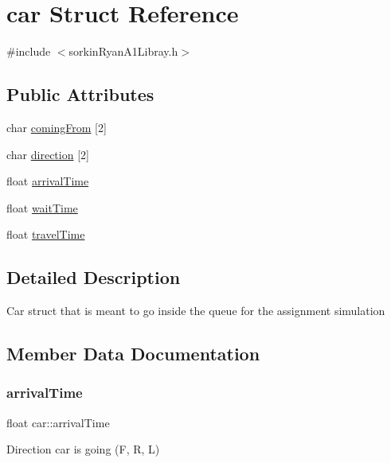 \hypertarget{structcar}{}\section{car Struct Reference}
\label{structcar}


{\ttfamily \#include $<$sorkin\+Ryan\+A1\+Libray.\+h$>$}

\subsection*{Public Attributes}
\begin{DoxyCompactItemize}
\item 
char \hyperlink{structcar_a4208701f83f56a82b4c60497ffca2932}{coming\+From} \mbox{[}2\mbox{]}
\item 
char \hyperlink{structcar_a38d24547773184258c1f98335a440e1c}{direction} \mbox{[}2\mbox{]}
\item 
float \hyperlink{structcar_ab23c46d7acda96f787f99e9930d1b1b6}{arrival\+Time}
\item 
float \hyperlink{structcar_a166a1d2ea40ef5977d26c3761a2a39c8}{wait\+Time}
\item 
float \hyperlink{structcar_a75e54f35b43292e1e2a30e54627d20ea}{travel\+Time}
\end{DoxyCompactItemize}


\subsection{Detailed Description}
Car struct that is meant to go inside the queue for the assignment simulation 

\subsection{Member Data Documentation}
\mbox{\label{structcar_ab23c46d7acda96f787f99e9930d1b1b6}} 
\subsubsection{\texorpdfstring{arrival\+Time}{arrivalTime}}
{\footnotesize\ttfamily float car\+::arrival\+Time}

Direction car is going (F, R, L) \mbox{\label{structcar_a4208701f83f56a82b4c60497ffca2932}} 
